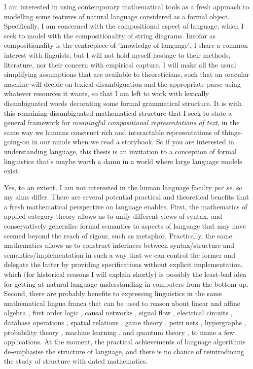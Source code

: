 
I am interested in using contemporary mathematical tools as a fresh approach to modelling some features of natural language considered as a formal object. Specifically, I am concerned with the compositional aspect of language, which I seek to model with the compositionality of string diagrams. Insofar as compositionality is the centrepiece of `knowledge of language', I share a common interest with linguists, but I will not hold myself hostage to their methods, literature, nor their concern with empirical capture. I will make all the usual simplifying assumptions that are available to theoreticians, such that an oracular machine will decide on lexical disambiguation and the appropriate parse using whatever resources it wants, so that I am left to work with lexically disambiguated words decorating some formal grammatical structure. It is with this remaining disambiguated mathematical structure that I seek to state a general framework for \emph{meaningful compositional representations of text}, in the same way we humans construct rich and interactable representations of things-going-on in our minds when we read a storybook. So if you are interested in understanding language, this thesis is an invitation to a conception of formal linguistics that's maybe worth a damn in a world where large language models exist.


Yes, to an extent. I am not interested in the human language faculty \emph{per se}, so my aims differ. There are several potential practical and theoretical benefits that a fresh mathematical perspective on language enables. First, the mathematics of applied category theory allows us to unify different views of syntax, and conservatively generalise formal semantics to aspects of language that may have seemed beyond the reach of rigour, such as metaphor. Practically, the same mathematics allows us to construct interfaces between syntax/structure and semantics/implementation in such a way that we can control the former and delegate the latter by providing specifications without explicit implementation, which (for historical reasons I will explain shortly) is possibly the least-bad idea for getting at natural language understanding in computers from the bottom-up. Second, there are probably benefits to expressing linguistics in the same mathematical lingua franca that can be used to reason about linear and affine algebra \citep{}, first order logic \citep{}, causal networks \citep{}, signal flow \citep{}, electrical circuits \citep{}, database operations \citep{}, spatial relations \citep{}, game theory \citep{}, petri nets \citep{}, hypergraphs \citep{}, probability theory \citep{}, machine learning \citep{}, and quantum theory \citep{}, to name a few applications. At the moment, the practical achievements of language algorithms de-emphasise the structure of language, and there is no chance of reintroducing the study of structure with dated mathematics.

